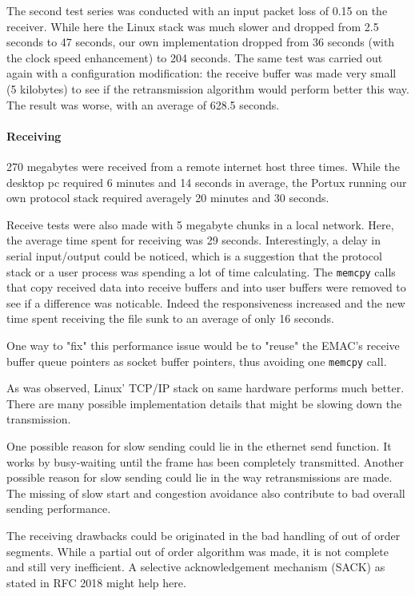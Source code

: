\documentclass[11pt,twoside,abstract,notitlepage]{scrreprt}
\begin{document}
The second test series was conducted with an input packet loss of 0.15 on the receiver. While here the Linux stack was much slower and dropped from 2.5 seconds to 47 seconds, our own implementation dropped from 36 seconds (with the clock speed enhancement) to 204 seconds. The same test was carried out again with a configuration modification: the receive buffer was made very small (5 kilobytes) to see if the retransmission algorithm would perform better this way. The result was worse, with an average of 628.5 seconds. 

\paragraph{Receiving}
270 megabytes were received from a remote internet host three times. While the desktop pc required 6 minutes and 14 seconds in average, the Portux running our own protocol stack required averagely 20 minutes and 30 seconds.

Receive tests were also made with 5 megabyte chunks in a local network. Here, the average time spent for receiving was 29 seconds. Interestingly, a delay in serial input/output could be noticed, which is a suggestion that the protocol stack or a user process was spending a lot of time calculating. The \texttt{memcpy} calls that copy received data into receive buffers and into user buffers were removed to see if a difference was noticable. Indeed the responsiveness increased and the new time spent receiving the file sunk to an average of only 16 seconds.

One way to "fix" this performance issue would be to "reuse" the EMAC's receive buffer queue pointers as socket buffer pointers, thus avoiding one \texttt{memcpy} call. 

As was observed, Linux' TCP/IP stack on same hardware performs much better. There are many possible implementation details that might be slowing down the transmission.

 One possible reason for slow sending could lie in the ethernet send function. It works by busy-waiting until the frame has been completely transmitted. Another possible reason for slow sending could lie in the way retransmissions are made. The missing of slow start and congestion avoidance also contribute to bad overall sending performance.


The receiving drawbacks could be originated in the bad handling of out of order segments. While a partial out of order algorithm was made, it is not complete and still very inefficient. A selective acknowledgement mechanism (SACK) as stated in RFC 2018 \cite{rfc2018} might help here.
\end{document}

